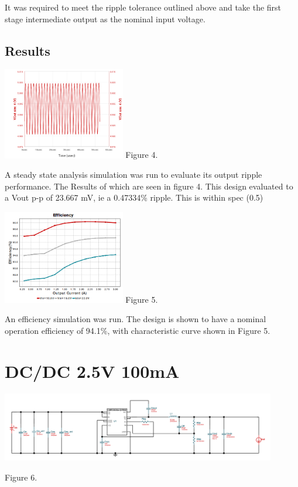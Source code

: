\documentclass[11pt, a4]{article}
\begin{document}
It was required to meet the ripple tolerance outlined above and take the first stage intermediate output as the nominal input voltage.
\subsection{Results}
\begin{center}
        \includegraphics[width=0.4\textwidth]{img/5v_ripple.png}
        Figure 4.
\end{center}
A steady state analysis simulation was run to evaluate its output ripple performance. The Results of which are seen in figure 4.
This design evaluated to a Vout p-p of 23.667 mV, ie a 0.47334\% ripple. This is within spec (0.5)
\begin{center}
        \includegraphics[width=0.4\textwidth]{img/5V_eff.png}
        Figure 5.
\end{center}
An efficiency simulation was run. The design is shown to have a nominal operation efficiency of 94.1\%, with characteristic curve shown in Figure 5.


\section{DC/DC 2.5V 100mA}
\includegraphics[width=0.9\textwidth]{img/dcdc2V5.png}
\begin{center}
        Figure 6.
\end{center}
\end{document}
